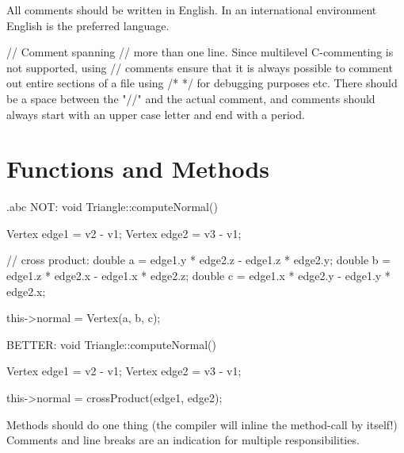 \recommendation
{All comments should be written in English.}
{}
{In an international environment English is the preferred language.}

{
	// Comment spanning\newline
	// more than one line.
}
{
	Since multilevel C-commenting is not supported, using // comments ensure that it is always possible to comment out entire sections of a file using /* */ for debugging purposes etc.\newline
	There should be a space between the "//" and the actual comment, and comments should always start with an upper case letter and end with a period.
}

\section{Functions and Methods}


\begin{filecontents*}{\jobname.abc}
	NOT: 
	void Triangle::computeNormal()
	{
	   Vertex edge1 = v2 - v1;
	   Vertex edge2 = v3 - v1;
		
	   // cross product:
	   double a = edge1.y * edge2.z - edge1.z * edge2.y;
	   double b = edge1.z * edge2.x - edge1.x * edge2.z;
	   double c = edge1.x * edge2.y - edge1.y * edge2.x;
		
	   this->normal = Vertex(a, b, c);
	}
	
	BETTER:
	void Triangle::computeNormal()
	{
	   Vertex edge1 = v2 - v1;
	   Vertex edge2 = v3 - v1;
	
	   this->normal = crossProduct(edge1, edge2);
	}
\end{filecontents*}

\recommendation
{Methods should do one thing (the compiler will inline the method-call by itself!)}
{}
{Comments and line breaks are an indication for multiple responsibilities.}